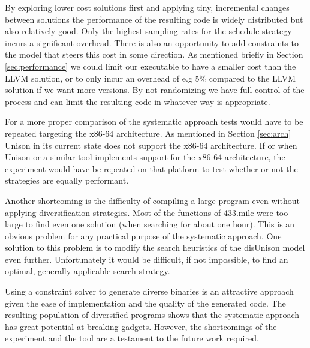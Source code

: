 By exploring lower cost solutions first and applying tiny, incremental changes between
solutions the performance of the resulting code is widely distributed but also relatively
good. Only the highest sampling rates for the schedule strategy incurs a significant
overhead. There is also an opportunity to add constraints to the model that steers this
cost in some direction. As mentioned briefly in Section \ref{sec:performance} we could
limit our executable to have a smaller cost than the LLVM solution, or to only incur an
overhead of e.g 5\% compared to the LLVM solution if we want more versions. By not
randomizing we have full control of the process and can limit the resulting code in
whatever way is appropriate.

For a more proper comparison of the systematic approach tests would have to be repeated
targeting the x86-64 architecture. As mentioned in Section \ref{sec:arch} Unison in its
current state does not support the x86-64 architecture. If or when Unison or a similar
tool implements support for the x86-64 architecture, the experiment would have be repeated
on that platform to test whether or not the strategies are equally performant.

Another shortcoming is the difficulty of compiling a large program even without applying
diversification strategies. Most of the functions of 433.milc were too large to find even
one solution (when searching for about one hour). This is an obvious problem for any
practical purpose of the systematic approach. One solution to this problem is to modify
the search heuristics of the disUnison model even further. Unfortunately it would be
difficult, if not impossible, to find an optimal, generally-applicable search strategy.

Using a constraint solver to generate diverse binaries is an attractive approach given
the ease of implementation and the quality of the generated code. The resulting population
of diversified programs shows that the systematic approach has great potential at breaking
gadgets. However, the shortcomings of the experiment and the tool are a testament to the
future work required.
